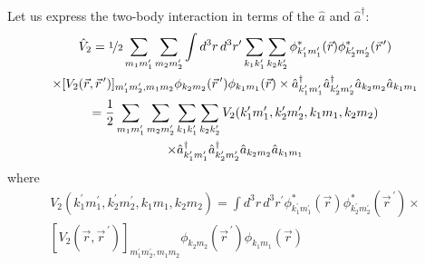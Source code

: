 \documentclass[12pt]{article}
\newcommand{\be}{\begin{equation}}
\newcommand{\ee}{\end{equation}}
\newcommand{\vecrp}{\ensuremath{\vec{r}^{\,\prime}}}
\begin{document}
Let us express the two-body interaction in terms 
of the $\hat{a}$ and $\hat{a}^\dagger$:
\be
\begin{gathered}
\hat{V}_2 = \nicefrac{1}{2}
\sum_{m_1m_1^\prime}\sum_{m_2m_2^\prime} 
\int d^3r\,d^3r^\prime
\sum_{k_1k_1^\prime}\sum_{k_2k_2^\prime}
\phi^*_{k_1^\prime m_1^\prime}(\vec{r})
\phi^*_{k_2^\prime m_2^\prime}(\vecrp)\\
\times
[V_2(\vec{r},\vecrp)]_{m_1^\prime m_2^\prime, m_1 m_2}
\phi_{k_2 m_2}(\vecrp)
\phi_{k_1 m_1}(\vec{r})
\times 
\hat{a}_{k_1^\prime m_1^\prime}^{\dagger} \hat{a}_{k_2^\prime m_2^\prime}^{\dagger} 
\hat{a}_{k_2 m_2} \hat{a}_{k_1 m_1}\\
= \frac{1}{2}
\sum_{m_1m_1^\prime}\sum_{m_2m_2^\prime} 
\sum_{k_1k_1^\prime}\sum_{k_2k_2^\prime}
V_2(k_1^\prime m_1^\prime, k_2^\prime m_2^\prime, k_1 m_1, k_2 m_2)\\
\times
\hat{a}_{k_1^\prime m_1^\prime}^{\dagger} \hat{a}_{k_2^\prime m_2^\prime}^{\dagger}
\hat{a}_{k_2 m_2} \hat{a}_{k_1 m_1}
\end{gathered}
\ee
where 
\be
\begin{gathered}
V_2(k_1^\prime m_1^\prime, k_2^\prime m_2^\prime, k_1 m_1, k_2 m_2)
= 
\int d^3r\,d^3r^\prime
\phi^*_{k_1^\prime m_1^\prime}(\vec{r})
\phi^*_{k_2^\prime m_2^\prime}(\vecrp)\times\\
[V_2(\vec{r},\vecrp)]_{m_1^\prime m_2^\prime, m_1 m_2}
\phi_{k_2 m_2}(\vecrp)
\phi_{k_1 m_1}(\vec{r})
\end{gathered}
\ee
\end{document}
